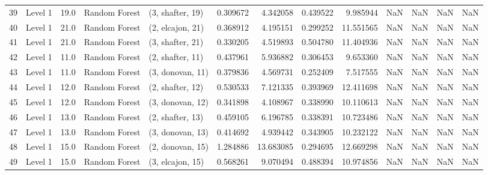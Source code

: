 \begin{tabular}{llrllrrrrrrrr}
39 &   Level 1 &   19.0 &  Random Forest &  (3, shafter, 19) &   0.309672 &   4.342058 &  0.439522 &   9.985944 &                  NaN &                    NaN &                 NaN &                   NaN \\
40 &   Level 1 &   21.0 &  Random Forest &  (2, elcajon, 21) &   0.368912 &   4.195151 &  0.299252 &  11.551565 &                  NaN &                    NaN &                 NaN &                   NaN \\
41 &   Level 1 &   21.0 &  Random Forest &  (3, shafter, 21) &   0.330205 &   4.519893 &  0.504780 &  11.404936 &                  NaN &                    NaN &                 NaN &                   NaN \\
42 &   Level 1 &   11.0 &  Random Forest &  (2, shafter, 11) &   0.437961 &   5.936882 &  0.306453 &   9.653360 &                  NaN &                    NaN &                 NaN &                   NaN \\
43 &   Level 1 &   11.0 &  Random Forest &  (3, donovan, 11) &   0.379836 &   4.569731 &  0.252409 &   7.517555 &                  NaN &                    NaN &                 NaN &                   NaN \\
44 &   Level 1 &   12.0 &  Random Forest &  (2, shafter, 12) &   0.530533 &   7.121335 &  0.393969 &  12.411698 &                  NaN &                    NaN &                 NaN &                   NaN \\
45 &   Level 1 &   12.0 &  Random Forest &  (3, donovan, 12) &   0.341898 &   4.108967 &  0.338990 &  10.110613 &                  NaN &                    NaN &                 NaN &                   NaN \\
46 &   Level 1 &   13.0 &  Random Forest &  (2, shafter, 13) &   0.459105 &   6.196785 &  0.338391 &  10.723486 &                  NaN &                    NaN &                 NaN &                   NaN \\
47 &   Level 1 &   13.0 &  Random Forest &  (3, donovan, 13) &   0.414692 &   4.939442 &  0.343905 &  10.232122 &                  NaN &                    NaN &                 NaN &                   NaN \\
48 &   Level 1 &   15.0 &  Random Forest &  (2, donovan, 15) &   1.284886 &  13.683085 &  0.294695 &  12.669298 &                  NaN &                    NaN &                 NaN &                   NaN \\
49 &   Level 1 &   15.0 &  Random Forest &  (3, elcajon, 15) &   0.568261 &   9.070494 &  0.488394 &  10.974856 &                  NaN &                    NaN &                 NaN &                   NaN \\

\end{tabular}
